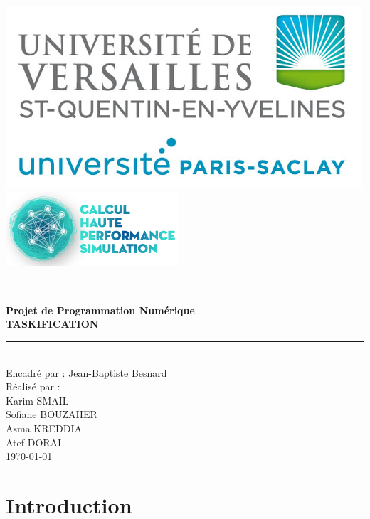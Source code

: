\documentclass[12pt,titlepage]{article}
\begin{document}
\begin{titlepage}
\newcommand{\HRule}{\rule{\linewidth}{0.1mm}}
\center

\includegraphics[scale=0.4]{logo.png} \\[0.2cm]
\includegraphics[scale=0.7]{CHPS_logo.png} \\[0.2cm]

\HRule \\[0.4cm]
{ \huge \bfseries Projet de Programmation Numérique \\ TASKIFICATION
  \\[0.15cm] }
\HRule \\[1.5cm]
Encadré par : Jean-Baptiste Besnard
\\Réalisé par : \\ Karim SMAIL\\ Sofiane BOUZAHER  \\ Asma  KREDDIA\\ Atef DORAI 
\\[1cm]
\today \\ [1cm]
\end{titlepage}


\renewcommand*\contentsname{Sommaire}
\tableofcontents

\pagebreak

\section{Introduction}
\end{document}

